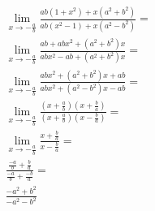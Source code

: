 \begin{ex}
\begin{align}
&\lim_{x\rightarrow -\frac{a}{b}} \frac{ab(1+x^2)+x(a^2+b^2)}{ab(x^2-1)+x(a^2-b^2)}=\nonumber\\
&\lim_{x\rightarrow -\frac{a}{b}} \frac{ab+abx^2+(a^2+b^2)x}{abx^2-ab+(a^2+b^2)x}=\nonumber\\
&\lim_{x\rightarrow -\frac{a}{b}} \frac{abx^2+(a^2+b^2)x+ab}{abx^2+(a^2-b^2)x-ab}=\nonumber\\
&\lim_{x\rightarrow -\frac{a}{b}} \frac{(x+\frac{a}{b})(x+\frac{b}{a})}{(x+\frac{a}{b})(x-\frac{b}{a})}=\nonumber\\
&\lim_{x\rightarrow -\frac{a}{b}} \frac{x+\frac{b}{a}}{x-\frac{b}{a}} =\nonumber\\ &\frac{\frac{-a}{b}+\frac{b}{a}}{\frac{-a}{b}+\frac{-b}{a}}=\nonumber\\
&\frac{-a^2+b^2}{-a^2-b^2}\nonumber
\end{align}
\end{ex}